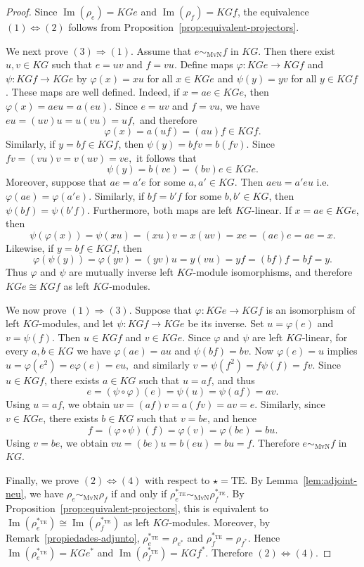 \documentclass[10pt,a4paper]{amsart}
\begin{document}
\begin{proof}
Since $\operatorname{Im}(\rho_e)=KGe$ and $\operatorname{Im}(\rho_f)=KGf$, the equivalence $(1)\Leftrightarrow(2)$ follows from Proposition~\ref{prop:equivalent-projectors}.

We next prove $(3)\Rightarrow(1)$. Assume that $e\sim_{\mathrm{MvN}}f$ in $KG$. Then there exist $u,v\in KG$ such that $e=uv$ and $f=vu$. Define maps $\varphi:KGe\to KGf$ and $\psi:KGf\to KGe$ by $\varphi(x)=xu$ for all $x\in KGe$ and $\psi(y)=yv$ for all $y\in KGf$. These maps are well defined. Indeed, if $x=ae\in KGe$, then
$
\varphi(x)=aeu=a(eu).
$
Since $e=uv$ and $f=vu$, we have
$
eu=(uv)u=u(vu)=uf,
$
and therefore
$$
\varphi(x)=a(uf)=(au)f\in KGf.
$$
Similarly, if $y=bf\in KGf$, then
$
\psi(y)=bfv=b(fv).
$
Since
$
fv=(vu)v=v(uv)=ve,
$
it follows that
$$
\psi(y)=b(ve)=(bv)e\in KGe.
$$ Moreover, suppose that $ae=a'e$ for some $a,a'\in KG$. Then  $aeu=a'eu$ i.e.
$\varphi(ae)=\varphi(a'e)$.  Similarly, if $bf=b'f$ for some $b,b'\in KG$, then $\psi(bf)=\psi(b'f)$.
Furthermore, both maps are left $KG$-linear. If $x=ae\in KGe$, then
$$
\psi(\varphi(x))=\psi(xu)=(xu)v=x(uv)=xe=(ae)e=ae=x.
$$
Likewise, if $y=bf\in KGf$, then
$$
\varphi(\psi(y))=\varphi(yv)=(yv)u=y(vu)=yf=(bf)f=bf=y.
$$
Thus $\varphi$ and $\psi$ are mutually inverse left $KG$-module isomorphisms, and therefore $KGe\cong KGf$ as left $KG$-modules.

We now prove $(1)\Rightarrow(3)$. Suppose that $\varphi:KGe\to KGf$ is an isomorphism of left $KG$-modules, and let $\psi:KGf\to KGe$ be its inverse. Set $u=\varphi(e)$ and $v=\psi(f)$. Then $u\in KGf$ and $v\in KGe$. Since $\varphi$ and $\psi$ are left $KG$-linear, for every $a,b\in KG$ we have
$
\varphi(ae)=au
$
and
$
\psi(bf)=bv.
$
Now $\varphi(e)=u$ implies
$
u=\varphi(e^2)=e\varphi(e)=eu,
$
and similarly
$
v=\psi(f^2)=f\psi(f)=fv.
$
Since $u\in KGf$, there exists $a\in KG$ such that $u=af$, and thus
$$
e=(\psi\circ\varphi)(e)=\psi(u)=\psi(af)=av.
$$
Using $u=af$, we obtain
$
uv=(af)v=a(fv)=av=e.
$
Similarly, since $v\in KGe$, there exists $b\in KG$ such that $v=be$, and hence
$$
f=(\varphi\circ\psi)(f)=\varphi(v)=\varphi(be)=bu.
$$
Using $v=be$, we obtain
$
vu=(be)u=b(eu)=bu=f.
$
Therefore $e\sim_{\mathrm{MvN}}f$ in $KG$.

Finally, we prove $(2)\Leftrightarrow(4)$ with respect to $\star=\mathrm{TE}$. By Lemma~\ref{lem:adjoint-neu}, we have
$
\rho_e\sim_{\mathrm{MvN}}\rho_f
$
if and only if
$
\rho_e^{\ast_{\mathrm{TE}}}\sim_{\mathrm{MvN}}\rho_f^{\ast_{\mathrm{TE}}}.
$
By Proposition~\ref{prop:equivalent-projectors}, this is equivalent to
$
\operatorname{Im}(\rho_e^{\ast_{\mathrm{TE}}})\cong \operatorname{Im}(\rho_f^{\ast_{\mathrm{TE}}})
$
as left $KG$-modules. Moreover, by Remark~\ref{propiedades-adjunto},
$
\rho_e^{\ast_{\mathrm{TE}}}=\rho_{e^\ast}
$
and
$
\rho_f^{\ast_{\mathrm{TE}}}=\rho_{f^\ast}.
$
Hence
$
\operatorname{Im}(\rho_e^{\ast_{\mathrm{TE}}})=KGe^\ast
$
and
$
\operatorname{Im}(\rho_f^{\ast_{\mathrm{TE}}})=KGf^\ast.
$
Therefore $(2)\Leftrightarrow(4)$.
\end{proof}
\end{document}
